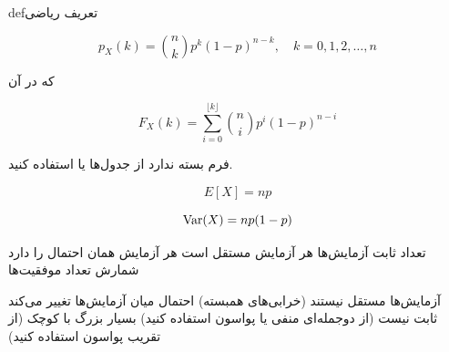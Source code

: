 \begin{PSbox}[unbreakable]{def}{تعریف ریاضی}


\end{PSbox}


\[p_X(k) = \binom{n}{k} p^k (1-p)^{n-k}, \quad k = 0, 1, 2, \ldots, n\]

که در آن 


\[F_X(k) = \sum_{i=0}^{\lfloor k \rfloor} \binom{n}{i} p^i (1-p)^{n-i}\]

فرم بسته ندارد  از جدول‌ها یا  استفاده کنید.


\[E[X] = np\]


\[\text{Var}(X) = np(1-p)\]


\lr{\PSyes{}} تعداد ثابت آزمایش‌ها \PSbr{}\lr{\PSyes{}} هر آزمایش مستقل است\PSbr{}\lr{\PSyes{}} هر آزمایش همان احتمال  را دارد\PSbr{}\lr{\PSyes{}} شمارش تعداد موفقیت‌ها


\PSno{} آزمایش‌ها مستقل نیستند (خرابی‌های همبسته)\PSbr{}\PSno{} احتمال میان آزمایش‌ها تغییر می‌کند\PSbr{} ثابت نیست (از دوجمله‌ای منفی یا پواسون استفاده کنید)\PSbr{} بسیار بزرگ با  کوچک (از تقریب پواسون استفاده کنید)



